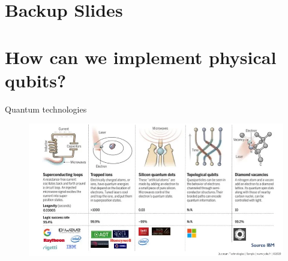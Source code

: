 \documentclass[11p,aspectratio=169]{beamer}
\begin{document}
\section{Backup Slides}




\section{How can we implement physical qubits?}

\begin{frame}{Quantum technologies}
    \begin{figure}
        \includegraphics[width=\textwidth]{figures/quantum_technologies.png}
    \end{figure}
\end{frame}
\end{document}
